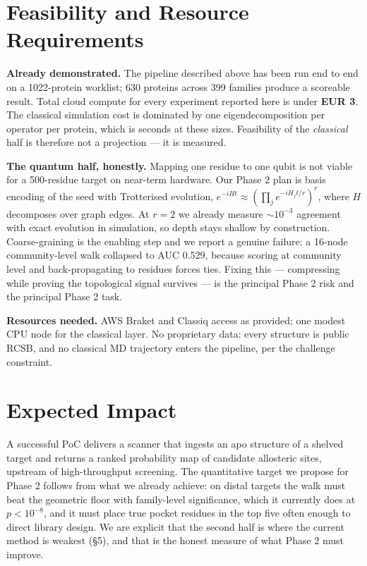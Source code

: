 \documentclass[10pt,a4paper,twocolumn]{article}
\newcommand{\num}[1]{\textbf{#1}}
\begin{document}
\section{Feasibility and Resource Requirements}

\textbf{Already demonstrated.} The pipeline described above has been run end to end on a
1022-protein worklist; 630 proteins across 399 families produce a scoreable result. Total cloud
compute for every experiment reported here is under \num{EUR 3}. The classical simulation cost
is dominated by one eigendecomposition per operator per protein, which is seconds at these sizes.
Feasibility of the \emph{classical} half is therefore not a projection --- it is measured.

\textbf{The quantum half, honestly.} Mapping one residue to one qubit is not viable for a
500-residue target on near-term hardware. Our Phase 2 plan is basis encoding of the seed with
Trotterised evolution, $e^{-iHt}\approx(\prod_j e^{-iH_jt/r})^r$, where $H$ decomposes over graph
edges. At $r=2$ we already measure $\sim10^{-3}$ agreement with exact evolution in simulation, so
depth stays shallow by construction. Coarse-graining is the enabling step and we report a genuine
failure: a 16-node community-level walk collapsed to AUC 0.529, because scoring at community level
and back-propagating to residues forces ties. Fixing this --- compressing while proving the
topological signal survives --- is the principal Phase 2 risk and the principal Phase 2 task.

\textbf{Resources needed.} AWS Braket and Classiq access as provided; one modest CPU node for the
classical layer. No proprietary data: every structure is public RCSB, and no classical MD
trajectory enters the pipeline, per the challenge constraint.

\section{Expected Impact}

A successful PoC delivers a scanner that ingests an apo structure of a shelved target and returns a
ranked probability map of candidate allosteric sites, upstream of high-throughput screening. The
quantitative target we propose for Phase 2 follows from what we already achieve: on distal targets
the walk must beat the geometric floor with family-level significance, which it currently does at
$p<10^{-8}$, and it must place true pocket residues in the top five often enough to direct library
design. We are explicit that the second half is where the current method is weakest (\S5), and that
is the honest measure of what Phase 2 must improve.
\end{document}
